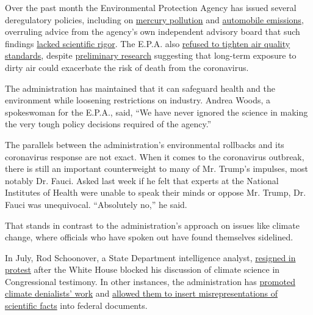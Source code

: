 Over the past month the Environmental Protection Agency has issued
several deregulatory policies, including on
\href{https://www.nytimes3xbfgragh.onion/2020/04/16/climate/epa-mercury-coal.html}{mercury
pollution} and
\href{https://www.nytimes3xbfgragh.onion/2020/03/30/climate/trump-fuel-economy.html}{automobile
emissions}, overruling advice from the agency's own independent advisory
board that such findings
\href{https://yosemite.epa.gov/sab/sabproduct.nsf/MeetingCalBOARD/D87AC6491A9811C1852584CD006F3CC6?OpenDocument}{lacked
scientific rigor}. The E.P.A. also
\href{https://www.nytimes3xbfgragh.onion/2020/04/14/climate/coronavirus-soot-clean-air-regulations.html}{refused
to tighten air quality standards}, despite
\href{https://www.nytimes3xbfgragh.onion/2020/04/07/climate/air-pollution-coronavirus-covid.html}{preliminary
research} suggesting that long-term exposure to dirty air could
exacerbate the risk of death from the coronavirus.

The administration has maintained that it can safeguard health and the
environment while loosening restrictions on industry. Andrea Woods, a
spokeswoman for the E.P.A., said, ``We have never ignored the science in
making the very tough policy decisions required of the agency.''

The parallels between the administration's environmental rollbacks and
its coronavirus response are not exact. When it comes to the coronavirus
outbreak, there is still an important counterweight to many of Mr.
Trump's impulses, most notably Dr. Fauci. Asked last week if he felt
that experts at the National Institutes of Health were unable to speak
their minds or oppose Mr. Trump, Dr. Fauci was unequivocal. ``Absolutely
no,'' he said.

That stands in contrast to the administration's approach on issues like
climate change, where officials who have spoken out have found
themselves sidelined.

In July, Rod Schoonover, a State Department intelligence analyst,
\href{https://www.nytimes3xbfgragh.onion/2019/07/10/climate/rod-schoonover-resigns.html}{resigned
in protest} after the White House blocked his discussion of climate
science in Congressional testimony. In other instances, the
administration has
\href{https://www.nytimes3xbfgragh.onion/2019/02/20/climate/climate-national-security-threat.html}{promoted
climate denialists' work} and
\href{https://www.nytimes3xbfgragh.onion/2020/03/02/climate/goks-uncertainty-language-interior.html}{allowed
them to insert misrepresentations of scientific facts} into federal
documents.


